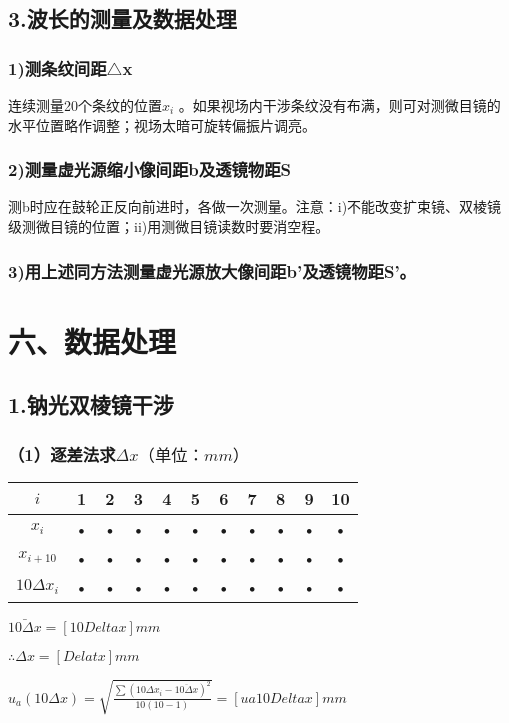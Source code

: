 \documentclass[11pt,a4paper,oneside]{article}
\begin{document}
\subsection*{3.波长的测量及数据处理}
\subsubsection*{1)测条纹间距${\bigtriangleup}$x}
连续测量20个条纹的位置${x_i}$ 。如果视场内干涉条纹没有布满，则可对测微目镜的水平位置略作调整；视场太暗可旋转偏振片调亮。
\subsubsection*{2)测量虚光源缩小像间距b及透镜物距S}
测b时应在鼓轮正反向前进时，各做一次测量。注意：i)不能改变扩束镜、双棱镜级测微目镜的位置；ii)用测微目镜读数时要消空程。
\subsubsection*{3)用上述同方法测量虚光源放大像间距b’及透镜物距S’。}

\section{六、数据处理}
\subsection{1.钠光双棱镜干涉}
\subsubsection{（1）逐差法求$\Delta x（单位：mm）$}
\begin{tabular}{|c|c|c|c|c|c|c|c|c|c|c|}
\hline 
$i$ & 1 & 2 & 3 & 4 & 5 & 6 & 7 & 8 & 9 & 10 \\ 
\hline 
$x_i$ & • & • & • & • & • & • & • & • & • & • \\ 
\hline 
$x_{i+10}$ & • & • & • & • & • & • & • & • & • & • \\ 
\hline 
$10\Delta x_i$ & • & • & • & • & • & • & • & • & • & • \\ 
\hline 
\end{tabular} 

$\bar{10\Delta x} = [10Delta x]mm$

$\therefore \Delta x = [Delat x]mm$

$u_a(10\Delta x) = \sqrt{\displaystyle\frac{\sum (10\Delta x_i-\overline{10\Delta x})^2}{10(10-1)}} = [ua10Deltax]mm$
\end{document}
